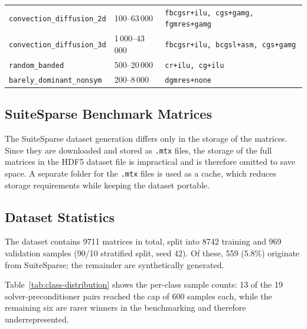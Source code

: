 \begin{table}[H]
\begin{tabular}{@{}llp{4.5cm}@{}}
    \texttt{convection\_diffusion\_2d} & 100–63\,000     & \texttt{fbcgsr+ilu, cgs+gamg, fgmres+gamg} \\
    \texttt{convection\_diffusion\_3d} & 1\,000–43\,000  & \texttt{fbcgsr+ilu, bcgsl+asm, cgs+gamg} \\
    \texttt{random\_banded}            & 500–20\,000     & \texttt{cr+ilu, cg+ilu} \\
    \texttt{barely\_dominant\_nonsym}  & 200–8\,000      & \texttt{dgmres+none} \\
    \bottomrule
  \end{tabular}
\end{table}


\subsection{SuiteSparse Benchmark Matrices}\label{subsec:SuiteSparse}

The SuiteSparse dataset generation differs only in the storage of the matrices.
Since they are downloaded and stored as \texttt{.mtx} files, the storage of the full matrices in the HDF5 dataset file is impractical
and is therefore omitted to save space.
A separate folder for the \texttt{.mtx} files is used as a cache, which reduces storage requirements while keeping the dataset portable.

\subsection{Dataset Statistics}\label{subsec:dataset-stats}

The dataset contains 9711 matrices in total, split into 8742 training and 969 validation
samples (90/10 stratified split, seed 42).
Of these, 559 (5.8\%) originate from SuiteSparse; the remainder are synthetically generated.

Table~\ref{tab:class-distribution} shows the per-class sample counts: 13 of the 19
solver-preconditioner pairs reached the cap of 600 samples each, while the remaining six
are rarer winners in the benchmarking and therefore underrepresented.

